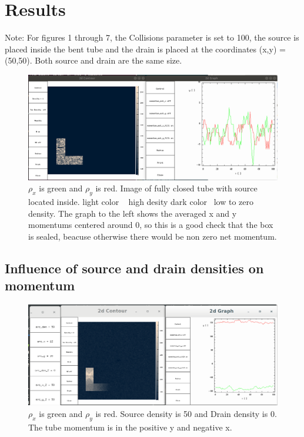 \documentclass{article}
\begin{document}
\section{Results}
\vspace{5mm}
Note: For figures 1 through 7, the Collisions parameter is set to 100, the source is placed inside the bent tube and the drain is placed at the coordinates (x,y) = (50,50). Both source and drain are the same size.
\vspace{5mm}
\begin{figure}[H]
\centering
\includegraphics[scale=0.3]{p1_noleakage.png}
\caption{\label{fig} $\rho_x$ is green and $\rho_y$ is red. Image of fully closed tube with source located inside. light color ~ high desity dark color ~low to zero density. The graph to the left shows the averaged x and y momentums centered around 0, so this is a good check that the box is sealed, beacuse otherwise there would be non zero net momentum.}
\end{figure}

\subsection{Influence of source and drain densities on momentum}
\begin{figure}[H]
\centering
\includegraphics[scale=0.25]{source_50_drain_0.png}
\caption{\label{fig} $\rho_x$ is green and $\rho_y$ is red. Source density is 50 and Drain density is 0. The tube momentum is in the positive y and negative x.}
\end{figure}
\end{document}

